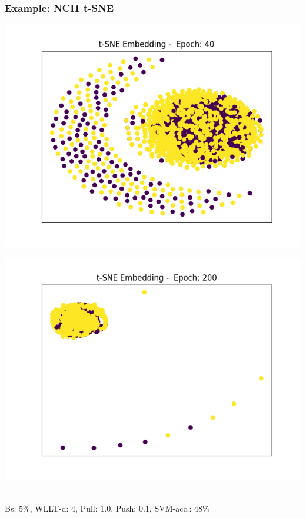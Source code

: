 \begin{frame}\frametitle{Example: NCI1 t-SNE}
	\begin{minipage}{0.49\textwidth}
		\includegraphics[width=\textwidth]{images/plot12tSNE}
	\end{minipage}
	\begin{minipage}{0.49\textwidth}
		\includegraphics[width=\textwidth]{images/plot13tSNE}
	\end{minipage}
	\vspace{2cm} \\
	\tiny{Bs: $5\%$, WLLT-d: $4$, Pull: $1.0$, Push: $0.1$, SVM-acc.: $48\%$}
\end{frame}

